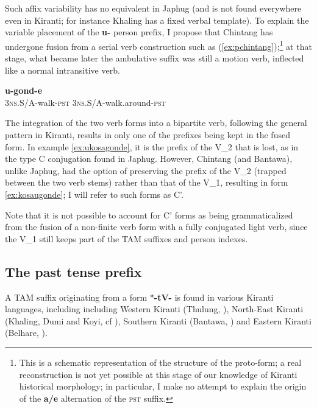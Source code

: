 \documentclass[oneside,a4paper,11pt]{article}
\newcommand{\ipa}[1]{{\phon\textbf{#1}}}
\newcommand{\refb}[1]{(\ref{#1})}
\begin{document}
Such affix variability has no equivalent in Japhug (and is not found everywhere even in Kiranti; for instance Khaling has a fixed verbal template). To explain the variable placement of the \ipa{u-} person prefix, I propose that Chintang has undergone  fusion from a serial verb construction such as \refb{ex:pchintang};\footnote{This is a schematic representation of the structure of the proto-form; a real reconstruction is not yet possible at this stage of our knowledge of Kiranti historical morphology; in particular, I make no attempt to explain the origin of the \ipa{a/e} alternation of the \textsc{pst} suffix. } at that stage, what became later the ambulative suffix was still a motion verb, inflected like a normal intransitive verb.

\begin{exe}
\ex \label{ex:pchintang}
\gll *\ipa{u-kos-e} \ipa{u-gond-e} \\
\textsc{3ns.S/A}-walk-\textsc{pst} \textsc{3ns.S/A}-walk.around-\textsc{pst} \\
\end{exe}


The integration of the two verb forms into a bipartite verb, following the general pattern in Kiranti, results in only one of the prefixes being kept in the fused form. In example \ref{ex:ukosagonde}, it is the prefix of the V_2 that is lost, as in the type C conjugation found in Japhug. However, Chintang (and Bantawa), unlike Japhug, had the option of preserving the prefix of the V_2 (trapped between the two verb stems) rather than that of the V_1, resulting in form \ref{ex:kosaugonde}; I will refer to such forms as C'.

Note that it is not possible to account for C' forms as being grammaticalized from the fusion of a non-finite verb form with a fully conjugated light verb, since the V_1 still keeps part of the TAM suffixes and person indexes.



\subsection{The past tense prefix} \label{sec:pst}
A TAM suffix originating from a form *\ipa{-tV-} is found in various Kiranti languages, including including Western Kiranti (Thulung, \citealt{lahaussois03}), North-East Kiranti (Khaling, Dumi and Koyi, cf \citealt{driem93dumi, lahaussois09, jacques12khaling}), Southern Kiranti (Bantawa, \citealt{doornenbal09}) and Eastern Kiranti (Belhare, \citealt[551]{bickel03belhare}).
\end{document}
